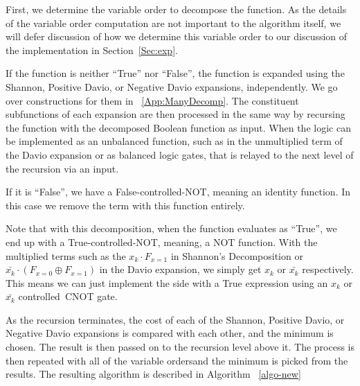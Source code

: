 \documentclass[paper]{ieice}
\providecommand{\DIFadd}[1]{{\protect\color{blue}{#1}}} %
\providecommand{\DIFaddbegin}{} %
\providecommand{\DIFaddend}{} %
\newcommand{\DIFaddincludegraphics}[2][]{{\color{blue}\fbox{\DIFOincludegraphics[#1]{#2}}}} %
\DeclareRobustCommand{\DIFaddbegin}{\DIFOaddbegin \let\includegraphics\DIFaddincludegraphics} %
\DeclareRobustCommand{\DIFaddend}{\DIFOaddend \let\includegraphics\DIFOincludegraphics} %
\begin{document}
First, we determine the variable order to decompose the function. As the details of the variable order
computation are not important to the algorithm itself, we will defer discussion of how we determine
this variable order to our discussion of the implementation in Section~\ref{Sec:exp}.

If the function is neither ``True'' nor ``False'', the function is expanded using the Shannon, Positive
Davio, or Negative Davio expansions, independently. We go over constructions for them in ~\ref{App:ManyDecomp}. The constituent subfunctions of each expansion are then processed in the same way by
recursing the function with the decomposed Boolean function as input. When the logic can be implemented as an
unbalanced function, such as in the unmultiplied term of the Davio expansion or as balanced logic gates, that is
relayed to the next level of the recursion via an input.

If it is ``False'', we have a False-controlled-NOT, meaning an identity function. In this case we remove the term
with this function entirely.

Note that with this decomposition, when the function evaluates as ``True'', we end up with a True-controlled-NOT, meaning, a NOT function. With the multiplied terms such as the $x_k \cdot F_{x=1}$ in Shannon's Decomposition or $\bar{x_k} \cdot (F_{x=0} \oplus F_{x=1})$ in the Davio expansion, we simply get $x_k$ or $\bar{x_k}$ respectively. This means we can just implement the side with a True expression using an $x_k$ or $\bar{x_k}$ controlled~CNOT gate. 

As the recursion terminates, the cost of each of the Shannon, Positive Davio, or Negative Davio expansions is
compared with each other, and the minimum is chosen. The result is then passed on to the recursion level above it.
The process is then repeated with all of the variable orders\DIFaddbegin \DIFadd{, }\DIFaddend and the minimum is picked from the results. The
resulting algorithm is described in Algorithm ~\ref{algo-new}
\end{document}
